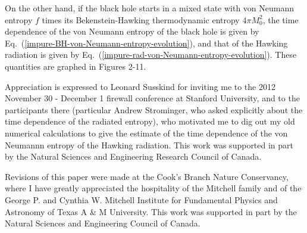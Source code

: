 \documentclass[12pt]{article}
\begin{document}
On the other hand, if the black hole starts in a mixed state with von Neumann entropy $f$ times its Bekenstein-Hawking thermodynamic entropy $4\pi M_0^2$, the time dependence of the von Neumann entropy of the black hole is given by Eq.\ (\ref{impure-BH-von-Neumann-entropy-evolution}), and that of the Hawking radiation is given by Eq.\ (\ref{impure-rad-von-Neumann-entropy-evolution}).  These quantities are graphed in Figures 2-11.



Appreciation is expressed to Leonard Susskind for inviting me to the 2012 November 30 - December 1 firewall conference at Stanford University, and to the participants there (particular Andrew Strominger, who asked explicitly about the time dependence of the radiated entropy), who motivated me to dig out my old numerical calculations to give the estimate of the time dependence of the von Neumannn entropy of the Hawking radiation.  This work was supported in part by the Natural Sciences and Engineering Research Council of Canada.

Revisions of this paper were made at the Cook's Branch Nature Conservancy, where I have greatly appreciated the hospitality of the Mitchell family and of the George P. and Cynthia W. Mitchell Institute for Fundamental Physics and Astronomy of Texas A \& M University.  This work was supported in part by the Natural Sciences and Engineering Council of Canada.
\end{document}
